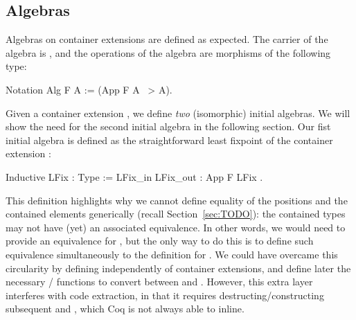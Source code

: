 \documentclass[anonymous, a4paper, UKenglish, cleveref, autoref, thm-restate]{lipics-v2021}
\begin{document}
\subsection{Algebras}

Algebras on container extensions are defined as expected. The carrier of the
algebra is , and the operations of the algebra are morphisms
of the following type:
\begin{coqcode}
Notation Alg F A := (App F A ~> A).
\end{coqcode}
Given a container extension , we define \emph{two}
(isomorphic) initial algebras. We will show the need for the second initial
algebra in the following section. Our fist initial algebra is defined as the
straightforward least fixpoint of the container extension :
\begin{coqcode}
Inductive LFix  : Type := LFix_in { LFix_out : App F LFix }.
\end{coqcode}
This definition highlights why we cannot define equality of the positions and
the contained elements generically (recall Section~\ref{sec:TODO}): the
contained types may not have (yet) an associated equivalence. In other words,
we would need to provide an equivalence for , but the
only way to do this is to define such equivalence simultaneously to the
definition for  .  We could have overcame this
circularity by defining   independently of container
extensions, and define later the necessary
/ functions to convert between
 and . However, this extra layer
interferes with code extraction, in that it requires destructing/constructing
subsequent  and  , which Coq is not
always able to inline.
\end{document}
